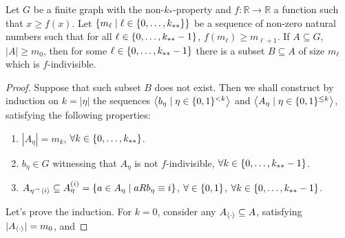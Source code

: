         \begin{lemma} \label{lem:existance_of_indivisible_sets}
            Let $G$ be a finite graph with the non-$k_*$-property and $f: \mathbb{R} \longrightarrow \mathbb{R}$ a function
            such that $x \geq f(x)$.
            Let $\{ m_\ell \mid \ell \in \{ 0, \dots, k_{**} \} \}$ be a sequence of non-zero natural numbers such that
            for all $\ell \in \{ 0, \dots, k_{**}-1 \}$, $f(m_{\ell}) \geq m_{\ell+1}$.
            If $A \subseteq G$, $|A| \geq m_0$, then for some $\ell \in \{ 0, \dots, k_{**}-1 \}$ there is a subset $B \subseteq A$
            of size $m_\ell$ which is $f$-indivisible.
            \begin{proof}
                Suppose that such subset $B$ does not exist.
                Then we shall construct by induction on $k = |\eta|$ the sequences $\left< b_\eta \mid \eta \in \{ 0,1 \}^{<k} \right>$
                and $\left< A_\eta \mid \eta \in \{ 0,1 \}^{\leq k} \right>$, satisfying the following properties:
                \begin{enumerate}[label={\Roman*}., ref={\Roman*}, font=\rmfamily]
                    \item\label{itm:existance_of_indivisible_sets.3} $|A_\eta| = m_k$, $\forall k \in \{ 0, \dots, k_{**} \}$.
                    \item\label{itm:existance_of_indivisible_sets.4} $b_\eta \in G$ witnessing that $A_\eta$ is not $f$-indivisible, $\forall k \in \{ 0, \dots, k_{**}-1 \}$.
                    \item\label{itm:existance_of_indivisible_sets.5} $A_{\eta^\frown \left< i \right>} \subseteq A_\eta^{(i)} = \{ a \in A_\eta \mid a R b_\eta \equiv i \}$,
                        $\forall \in \{ 0,1 \}$, $\forall k \in \{ 0, \dots, k_{**}-1 \}$.
                \end{enumerate}
                Let's prove the induction.
                For $k=0$, consider any $A_{\left< \cdot \right>} \subseteq A$, satisfying $|A_{\left< \cdot \right>}| = m_0$, and

\end{proof}
\end{lemma}

